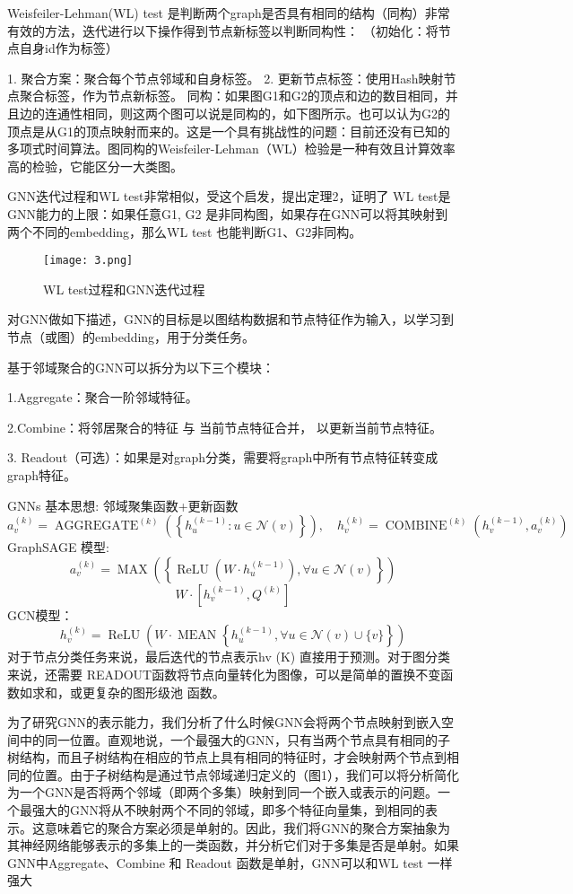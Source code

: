 \documentclass[a4paper,UTF8]{article}
\numberwithin{equation}{section}
\begin{document}
{		Weisfeiler-Lehman(WL) test 是判断两个graph是否具有相同的结构（同构）非常有效的方法，迭代进行以下操作得到节点新标签以判断同构性：
		（初始化：将节点自身id作为标签）
		
		1. 聚合方案：聚合每个节点邻域和自身标签。
		2. 更新节点标签：使用Hash映射节点聚合标签，作为节点新标签。
		同构：如果图G1和G2的顶点和边的数目相同，并且边的连通性相同，则这两个图可以说是同构的，如下图所示。也可以认为G2的顶点是从G1的顶点映射而来的。这是一个具有挑战性的问题：目前还没有已知的多项式时间算法。图同构的Weisfeiler-Lehman（WL）检验是一种有效且计算效率高的检验，它能区分一大类图。
		
		GNN迭代过程和WL test非常相似，受这个启发，\citep{conf/Keyulu2019}提出定理2，证明了 WL test是GNN能力的上限：如果任意G1, G2 是非同构图，如果存在GNN可以将其映射到两个不同的embedding，那么WL test 也能判断G1、G2非同构。
		
		\begin{figure}[ht]
			\centering
			\texttt{[image: 3.png]}
			\caption{WL test过程和GNN迭代过程}
			\label{fig:label}
		\end{figure}
		
		对GNN做如下描述，GNN的目标是以图结构数据和节点特征作为输入，以学习到节点（或图）的embedding，用于分类任务。
		
		基于邻域聚合的GNN可以拆分为以下三个模块：
		
		1.Aggregate：聚合一阶邻域特征。
		
		2.Combine：将邻居聚合的特征 与 当前节点特征合并， 以更新当前节点特征。
		
		3. Readout（可选）：如果是对graph分类，需要将graph中所有节点特征转变成graph特征。
		
		GNNs 基本思想: 邻域聚集函数+更新函数
		$$
		a_{v}^{(k)}=\operatorname{AGGREGATE}^{(k)}\left(\left\{h_{u}^{(k-1)}: u \in \mathcal{N}(v)\right\}\right), \quad h_{v}^{(k)}=\operatorname{COMBINE}^{(k)}\left(h_{v}^{(k-1)}, a_{v}^{(k)}\right)
		$$
		GraphSAGE 模型:
		$$
		a_{v}^{(k)}=\operatorname{MAX}\left(\left\{\operatorname{ReLU}\left(W \cdot h_{u}^{(k-1)}\right), \forall u \in \mathcal{N}(v)\right\}\right)
		$$
		$$
		W \cdot\left[h_{v}^{(k-1)}, Q^{(k)}\right]
		$$
		GCN模型：
		$$
		h_{v}^{(k)}=\operatorname{ReLU}\left(W \cdot \operatorname{MEAN}\left\{h_{u}^{(k-1)}, \forall u \in \mathcal{N}(v) \cup\{v\}\right\}\right)
		$$
		对于节点分类任务来说，最后迭代的节点表示hv (K) 直接用于预测。对于图分类来说，还需要 READOUT函数将节点向量转化为图像，可以是简单的置换不变函数如求和，或更复杂的图形级池 函数。
		
		为了研究GNN的表示能力，我们分析了什么时候GNN会将两个节点映射到嵌入空间中的同一位置。直观地说，一个最强大的GNN，只有当两个节点具有相同的子树结构，而且子树结构在相应的节点上具有相同的特征时，才会映射两个节点到相同的位置。由于子树结构是通过节点邻域递归定义的（图1），我们可以将分析简化为一个GNN是否将两个邻域（即两个多集）映射到同一个嵌入或表示的问题。一个最强大的GNN将从不映射两个不同的邻域，即多个特征向量集，到相同的表示。这意味着它的聚合方案必须是单射的。因此，我们将GNN的聚合方案抽象为其神经网络能够表示的多集上的一类函数，并分析它们对于多集是否是单射。如果GNN中Aggregate、Combine 和 Readout 函数是单射，GNN可以和WL test 一样强大
		
}
\end{document}
